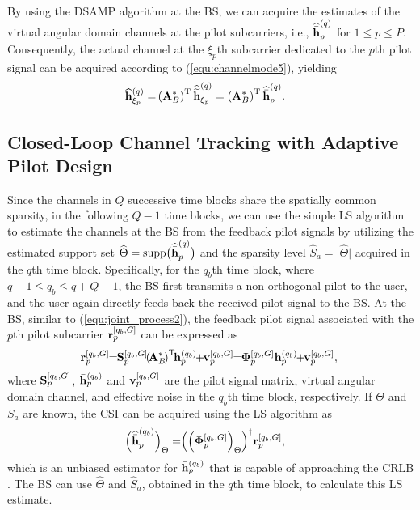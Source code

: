 \documentclass[final]{IEEEtran}
\begin{document}
 By using the DSAMP algorithm at the BS, we can acquire the estimates of the virtual
 angular domain channels at the pilot subcarriers, i.e., $\widehat{\bar{\bf h}}_p^{(q)}$
 for $1\le p \le P$. Consequently, the actual channel at the $\xi_p$th subcarrier
 dedicated to the $p$th pilot signal can be acquired according to (\ref{equ:channelmode5}),
 yielding
\begin{align}\label{equ:CSI_estimation} %
 \widehat{\bf h}_{\xi_p}^{(q)} =& \left( {\bf A}_{B}^{*} \right)^{\rm T}
 \widehat{\widetilde{\bf h}}_{\xi_p}^{(q)} = \left( {\bf A}_B^{*} \right)^{\rm T}
 \widehat{\bar{\bf h}}_p^{(q)} .
\end{align}

\subsection{Closed-Loop Channel Tracking with Adaptive Pilot Design}\label{S3.4}

 Since the channels in $Q$ successive time blocks share the spatially common sparsity,
 in the following $Q-1$ time blocks, we can use the simple LS algorithm to estimate
 the channels at the BS from the feedback pilot signals by utilizing the estimated
 support set $\widehat{\Theta}={\rm{supp}}\big(\widehat{\bar{\bf h}}_p^{(q)}\big)$ and
 the sparsity level $\widehat{S}_a=\big| \widehat{\Theta}\big|$ acquired in the $q$th
 time block. Specifically, for the $q_b$th time block, where $q+1\le q_b\le q+Q-1$, the BS
 first transmits a non-orthogonal pilot to the user, and the user again directly feeds
 back the received pilot signal to the BS. At the BS, similar to (\ref{equ:joint_process2}),
 the feedback pilot signal associated with the $p$th pilot subcarrier ${\bf r}_p^{[q_b,G]}$
 can be expressed as
\begin{align}\label{equ:joint_process7}  %
  \! \!{\bf r}_p^{[q_b,G]} \! \!= \!\!{\bf S}_p^{[q_b,G]} \!\!\left(  \!{\bf A}_B^{*} \!\right)^{\rm T}\!
 \!\bar{\bf h}_p^{(q_b)}\! \! + \! \!{\bf v}_p^{[q_b,G]}
  \!\!= \! \!{\bf{\Phi}}_p^{[q_b,G]}\bar{\bf h}_p^{(q_b)}  \!\!+ \! \!{\bf v}_p^{[q_b,G]},%
\end{align}
 where ${\bf S}_p^{[q_b,G]}$, $\bar{\bf h}_p^{(q_b)}$ and ${\bf v}_p^{[q_b,G]}$ are the
 pilot signal matrix, virtual angular domain channel, and effective noise in the $q_b$th
 time block, respectively. If $\Theta$ and $S_a$ are known, the CSI can be
 acquired using the LS algorithm as
\begin{align}\label{eq13}
 \Big( \widehat{\bar{\bf h}}_p^{(q_b)} \Big)_{\Theta} =& \Big( \Big( {\bf{\Phi}}_p^{[q_b,G]}
 \Big)_{\Theta} \Big)^{\dag} {\bf r}_p^{[q_b,G]},%
\end{align}
 which is an unbiased estimator for $\bar{\bf h}_p^{(q_b)}$ that is capable of approaching
 the CRLB \cite{threshold}. The BS can use $\widehat{\Theta}$ and $\widehat{S}_a$, obtained
 in the $q$th time block, to calculate this LS estimate.
\end{document}
